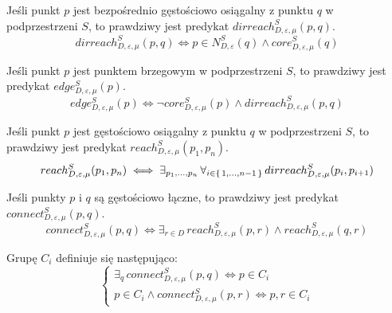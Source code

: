 \pagebreak {} \newline
Jeśli punkt $ p $ jest bezpośrednio gęstościowo osiągalny z punktu $ q $ w podprzestrzeni $ S $, to prawdziwy jest predykat $ dirreach^S_{D,\varepsilon,\mu}(p, q) $.
\begin{equation}
	dirreach^S_{D,\varepsilon,\mu}(p, q) \iff p \in N^S_{D,\varepsilon}(q) \land core^S_{D,\varepsilon,\mu}(q)
\end{equation}

 \newline
Jeśli punkt $ p $ jest punktem brzegowym w podprzestrzeni $ S $, to prawdziwy jest predykat $ edge^S_{D,\varepsilon,\mu}(p) $.
\begin{equation}
	edge^S_{D,\varepsilon,\mu}(p) \iff \neg core^S_{D,\varepsilon,\mu}(p) \land dirreach^S_{D,\varepsilon,\mu}(p,q)
\end{equation}

 \newline
Jeśli punkt $ p $ jest gęstościowo osiągalny z punktu $ q $ w podprzestrzeni $ S $, to prawdziwy jest predykat $ reach^S_{D,\varepsilon,\mu}(p_1, p_n) $.
\begin{equation}
	reach^S_{D,\varepsilon,\mu}(p_1, p_n)	\iff 	\exists_{p_1,\dots,p_n}\,\forall_{i\in\set{1,\dots,n-1}}\,dirreach^S_{D,\varepsilon,\mu}(p_i, p_{i+1}) 
\end{equation}

 \newline
Jeśli punkty $ p $ i $ q $ są gęstościowo łączne, to prawdziwy jest predykat \linebreak $ connect^S_{D,\varepsilon,\mu}(p, q) $.
\begin{equation}
connect^S_{D,\varepsilon,\mu}(p, q) \iff \exists_{r\in D}\,reach^S_{D,\varepsilon,\mu}(p, r) \land reach^S_{D,\varepsilon,\mu}(q, r)
\end{equation}

 \newline
Grupę $ C_i $ definiuje się następująco:
\begin{equation}
	\left\{
	\begin{array}{l}
		\exists_q\,connect^S_{D,\varepsilon,\mu}(p,q) \iff p\in C_i \\
		p \in C_i \land connect^S_{D,\varepsilon,\mu}(p,r) \iff p,r\in C_i 
	\end{array}
	\right.
\end{equation}


